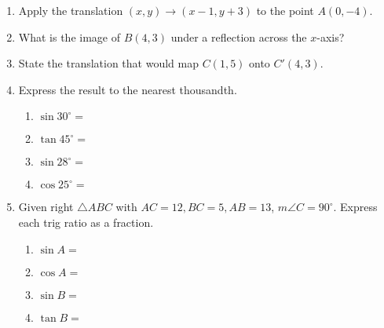 \documentclass[12pt, twoside]{article}
\begin{document}
\begin{enumerate}
  \item Apply the translation $(x,y) \rightarrow (x-1,y+3)$ to the point $A(0,-4)$. \vspace{1cm}
  \item What is the image of $B(4,3)$ under a reflection across the $x$-axis? \vspace{1cm}
  \item State the translation that would map $C(1,5)$ onto $C'(4,3)$. \vspace{1cm}

  \item Express the result to the nearest thousandth.  \vspace{0.5cm}
    \begin{multicols}{2}
      \begin{enumerate}
        \item $\sin 30^\circ = $ \vspace{0.5cm}
        \item $\tan 45^\circ =$
        \item $\sin 28^\circ = $ \vspace{0.5cm}
        \item $\cos 25^\circ =$
      \end{enumerate}
    \end{multicols}

\newpage
  \item Given right $\triangle ABC$ with $AC=12, BC=5, AB=13$, $m\angle C=90^\circ$. Express each trig ratio as a fraction.
    \begin{center}
       \vspace{1cm}
    \end{center}
    \begin{multicols}{2}
      \begin{enumerate}
        \item $\sin A = $ \vspace{1cm}
        \item $\cos A =$
        \item $\sin B = $ \vspace{1cm}
        \item $\tan B =$
      \end{enumerate}
    \end{multicols}


\end{enumerate}
\end{document}
